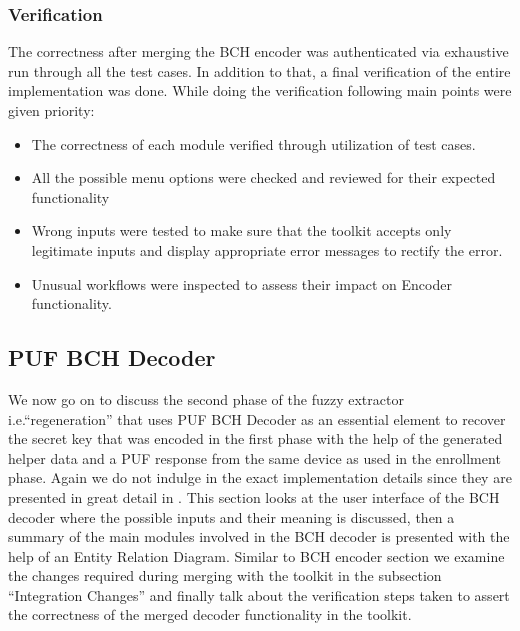 	\subsubsection{Verification}
	The correctness after merging the BCH encoder was authenticated via exhaustive run through all the test cases. In addition to that, a final verification of the entire implementation was done. While doing the verification following main points were given priority:

	\begin{itemize}
		\item The correctness of each module verified through utilization of test cases.
		\item All the possible menu options were checked and reviewed for their expected functionality
		\item Wrong inputs were tested to make sure that the toolkit accepts only legitimate inputs and display appropriate error messages to rectify the error.
		\item Unusual workflows were inspected to assess their impact on Encoder functionality.
	\end{itemize}

	\subsection{PUF BCH Decoder}
	We now go on to discuss the second phase of the fuzzy extractor i.e.``regeneration'' that uses PUF BCH Decoder as an essential element to recover the secret key that was encoded in the first phase with the help of the generated helper data and a PUF response from the same device as used in the enrollment phase. Again we do not indulge in the exact implementation details since they are presented in great detail in \cite{71}. This section looks at the user interface of the BCH decoder where the possible inputs and their meaning is discussed, then a summary of the main modules involved in the BCH decoder
	is presented with the help of an Entity Relation Diagram. Similar to BCH encoder section we examine the changes required during merging with the toolkit in the subsection ``Integration Changes'' and finally talk about the verification steps taken to assert the correctness of the merged decoder functionality in the toolkit.\\

